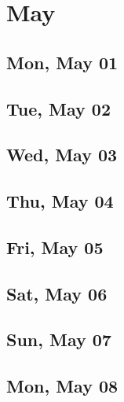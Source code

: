 \chapter{May}
	\section{Mon, May 01}
		
		
	\section{Tue, May 02}
		
		
	\section{Wed, May 03}
		
		
	\section{Thu, May 04}
		
		
	\section{Fri, May 05}
		
		
	\section{Sat, May 06}
		
		
	\section{Sun, May 07}
		
		
	\section{Mon, May 08}
		
		
